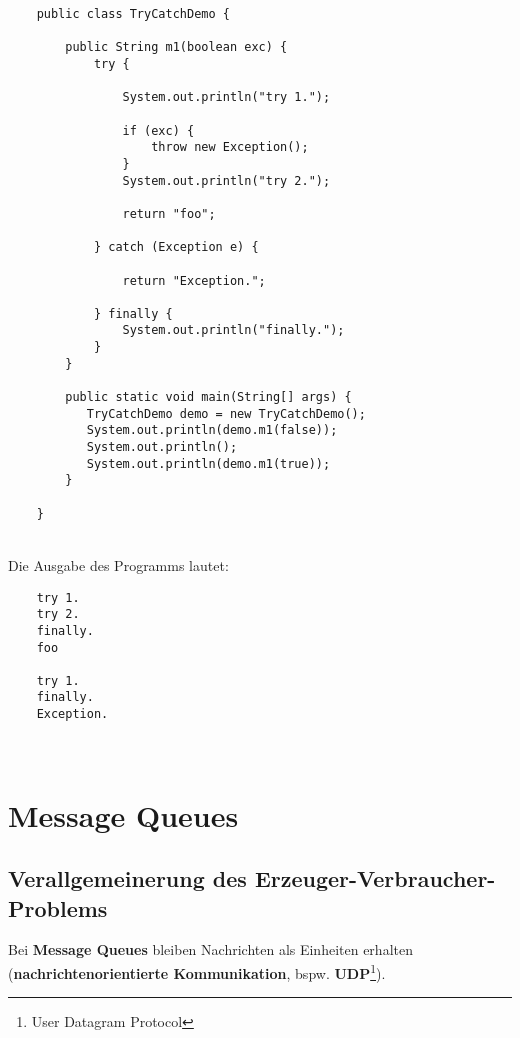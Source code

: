 \begin{verbatim}
    public class TryCatchDemo {

        public String m1(boolean exc) {
            try {

                System.out.println("try 1.");

                if (exc) {
                    throw new Exception();
                }
                System.out.println("try 2.");

                return "foo";

            } catch (Exception e) {

                return "Exception.";

            } finally {
                System.out.println("finally.");
            }
        }

        public static void main(String[] args) {
           TryCatchDemo demo = new TryCatchDemo();
           System.out.println(demo.m1(false));
           System.out.println();
           System.out.println(demo.m1(true));
        }

    }
\end{verbatim}\\

Die Ausgabe des Programms lautet:


\noindent
\begin{verbatim}
    try 1.
    try 2.
    finally.
    foo

    try 1.
    finally.
    Exception.
\end{verbatim}\\


\section{Message Queues}

\subsection{Verallgemeinerung des Erzeuger-Verbraucher-Problems}

Bei \textbf{Message Queues} bleiben Nachrichten als Einheiten erhalten (\textbf{nachrichtenorientierte Kommunikation}, bspw. \textbf{UDP}\footnote{User Datagram Protocol}).\\

